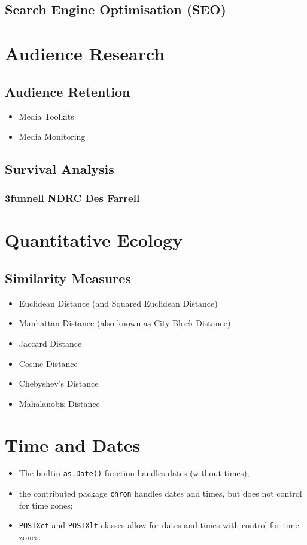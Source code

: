 \documentclass[12pt]{article} %
\begin{document}
\subsection{Search Engine Optimisation (SEO)}
\section{Audience Research}
\subsection{Audience Retention}
\begin{itemize}
\item Media Toolkits
\item Media Monitoring
\end{itemize}
\subsection{Survival Analysis}
\subsubsection{3funnell NDRC Des Farrell}
\section{Quantitative Ecology}
\subsection{Similarity Measures}
\begin{itemize}
\item Euclidean Distance  (and Squared Euclidean Distance)
\item Manhattan Distance (also known as City Block Distance)
\item Jaccard Distance
\item Cosine Distance
\item Chebyshev's Distance
\item Mahalanobis Distance
\end{itemize}
\section{Time and Dates}
\begin{itemize}\item The builtin
\texttt{as.Date()} function handles dates (without times);\item the contributed package
\texttt{chron} handles dates and times, but does not control for time zones; \item
\texttt{POSIXct} and \texttt{POSIXlt} classes allow for dates and times with control for time
zones.
\end{itemize}
\end{document}
